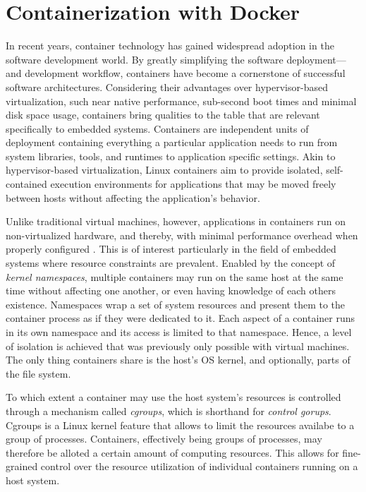 
\section{Containerization with Docker}

In recent years, container technology has gained widespread adoption in the software development world. By greatly simplifying the software deployment—and development workflow, containers have become a cornerstone of successful software architectures.
Considering their advantages over hypervisor-based virtualization, such near native performance, sub-second boot times \cite{felter2015updated}\cite{morabito2015hypervisors} and minimal disk space usage, containers bring qualities to the table that are relevant specifically to embedded systems.
Containers are independent units of deployment containing everything a particular application needs to run from system libraries, tools, and runtimes to application specific settings. 
Akin to hypervisor-based virtualization, Linux containers aim to provide isolated, self-contained execution environments for applications that may be moved freely between hosts without affecting the application’s behavior.

Unlike traditional virtual machines, however, applications in containers run on non-virtualized hardware, and thereby, with minimal performance overhead when properly configured \cite{felter2015updated}\cite{morabito2015hypervisors}. This is of interest particularly in the field of embedded systems where resource constraints are prevalent.
Enabled by the concept of \emph{kernel namespaces}, multiple containers may run on the same host at the same time without affecting one another, or even having knowledge of each others existence. 
Namespaces wrap a set of system resources and present them to the container process as if they were dedicated to it. Each aspect of a container runs in its own namespace and its access is limited to that namespace. Hence, a level of isolation is achieved that was previously only possible with virtual machines. The only thing containers share is the host’s OS kernel, and optionally, parts of the file system.

To which extent a container may use the host system's resources is controlled through a mechanism called \emph{cgroups}, which is shorthand for \emph{control gorups}. 
Cgroups is a Linux kernel feature that allows to limit the resources availabe to a group of processes. Containers, effectively being groups of processes, may therefore be alloted a certain amount of computing resources. This allows for fine-grained control over the resource utilization of individual containers running on a host system.


